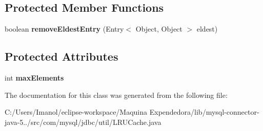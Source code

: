 \subsection*{Protected Member Functions}
\begin{DoxyCompactItemize}
\item 
\mbox{\label{classcom_1_1mysql_1_1jdbc_1_1util_1_1_l_r_u_cache_a7fbec740ef83f2b83f36aeb8566452e1}} 
boolean {\bfseries remove\+Eldest\+Entry} (Entry$<$ Object, Object $>$ eldest)
\end{DoxyCompactItemize}
\subsection*{Protected Attributes}
\begin{DoxyCompactItemize}
\item 
\mbox{\label{classcom_1_1mysql_1_1jdbc_1_1util_1_1_l_r_u_cache_a490309c7e4118001e10803dba1383824}} 
int {\bfseries max\+Elements}
\end{DoxyCompactItemize}


The documentation for this class was generated from the following file\+:\begin{DoxyCompactItemize}
\item 
C\+:/\+Users/\+Imanol/eclipse-\/workspace/\+Maquina Expendedora/lib/mysql-\/connector-\/java-\/5../src/com/mysql/jdbc/util/L\+R\+U\+Cache.\+java\end{DoxyCompactItemize}
